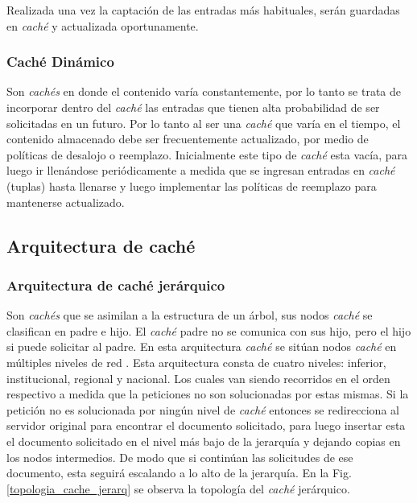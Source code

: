 \documentclass[12pt]{ociamthesis}  %
\begin{document}
Realizada una vez la captación de las entradas más habituales, serán guardadas en \textit{caché} y actualizada oportunamente.\\

\subsubsection{Caché Dinámico}
Son \textit{cachés} en donde el contenido varía constantemente, por lo tanto se trata de incorporar dentro del \textit{caché} las entradas que tienen alta probabilidad de ser solicitadas en un futuro. Por lo tanto al ser una \textit{caché} que varía en el tiempo, el contenido almacenado debe ser frecuentemente actualizado, por medio de políticas de desalojo o reemplazo. Inicialmente este tipo de \textit{caché} esta vacía, para luego ir llenándose periódicamente a medida que se ingresan entradas en \textit{caché} (tuplas) hasta llenarse y luego implementar las políticas de reemplazo para mantenerse actualizado.

\subsection{Arquitectura de caché}

\subsubsection{Arquitectura de caché jerárquico}
Son \textit{cachés} que se asimilan a la estructura de un árbol, sus nodos \textit{caché} se clasifican en padre e hijo. El \textit{caché} padre no se comunica con sus hijo, pero el hijo si puede solicitar al padre. En esta arquitectura \textit{caché} se sitúan nodos \textit{caché} en múltiples niveles de red \cite{rodriguez2001analysis}. Esta arquitectura consta de cuatro niveles: inferior, institucional, regional y nacional. Los cuales van siendo recorridos en el orden respectivo a medida que la peticiones no son solucionadas por estas mismas. Si la petición no es solucionada por ningún nivel de \textit{caché} entonces se redirecciona al servidor original para encontrar el documento solicitado, para luego insertar esta el documento solicitado en el nivel más bajo de la jerarquía y dejando copias en los nodos intermedios. De modo que si continúan las solicitudes de ese documento, esta seguirá escalando a lo alto de la jerarquía. En la Fig. \ref{topologia_cache_jerarq} se observa la topología del \textit{caché} jerárquico.
\end{document}
